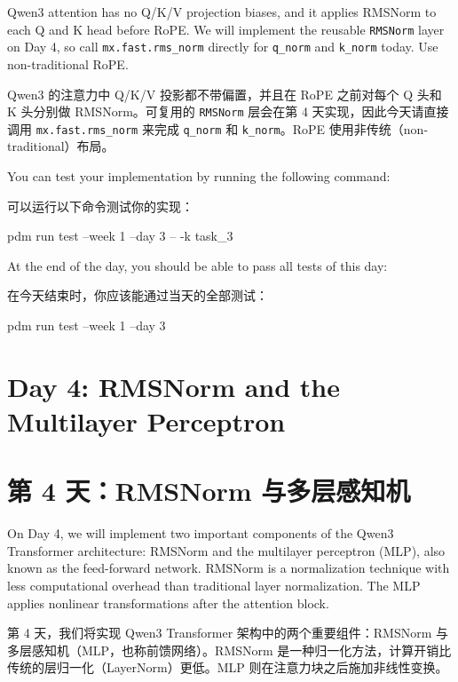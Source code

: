 \documentclass[11pt,a4paper]{article}
\newenvironment{zhpar}{%
  \par\smallskip\begingroup\color{zhcolor}\small\ignorespaces%
}{\endgroup\par\smallskip}
\begin{document}
Qwen3 attention has no Q/K/V projection biases, and it applies RMSNorm to each Q and K head before RoPE. We will implement the reusable \texttt{RMSNorm} layer on Day 4, so call \texttt{mx.fast.rms\_norm} directly for \texttt{q\_norm} and \texttt{k\_norm} today. Use non-traditional RoPE.

\begin{zhpar}
Qwen3 的注意力中 Q/K/V 投影都不带偏置，并且在 RoPE 之前对每个 Q 头和 K 头分别做 RMSNorm。可复用的 \texttt{RMSNorm} 层会在第 4 天实现，因此今天请直接调用 \texttt{mx.fast.rms\_norm} 来完成 \texttt{q\_norm} 和 \texttt{k\_norm}。RoPE 使用非传统（non-traditional）布局。
\end{zhpar}
You can test your implementation by running the following command:

\begin{zhpar}
可以运行以下命令测试你的实现：
\end{zhpar}
\begin{codeblock}
pdm run test --week 1 --day 3 -- -k task_3
\end{codeblock}

At the end of the day, you should be able to pass all tests of this day:

\begin{zhpar}
在今天结束时，你应该能通过当天的全部测试：
\end{zhpar}
\begin{codeblock}
pdm run test --week 1 --day 3
\end{codeblock}

\clearpage
\section*{Day 4: RMSNorm and the Multilayer Perceptron}

\section*{第 4 天：RMSNorm 与多层感知机}

On Day 4, we will implement two important components of the Qwen3 Transformer architecture: RMSNorm and the multilayer perceptron (MLP), also known as the feed-forward network. RMSNorm is a normalization technique with less computational overhead than traditional layer normalization. The MLP applies nonlinear transformations after the attention block.

\begin{zhpar}
第 4 天，我们将实现 Qwen3 Transformer 架构中的两个重要组件：RMSNorm 与多层感知机（MLP，也称前馈网络）。RMSNorm 是一种归一化方法，计算开销比传统的层归一化（LayerNorm）更低。MLP 则在注意力块之后施加非线性变换。
\end{zhpar}
\end{document}
